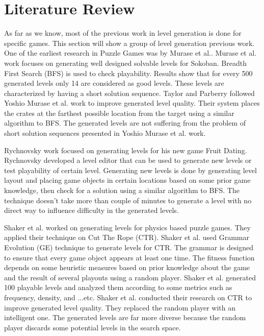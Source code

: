 \documentclass[letterpaper]{article}
\begin{document}
\section{Literature Review}
As far as we know, most of the previous work in level generation is done for specific games. This section will show a group of level generation previous work. One of the earliest research in Puzzle Games was by Murase et al.\cite{sokobanLevelGenerationOld}. Murase et al. work focuses on generating well designed solvable levels for Sokoban\cite{sokoban}. Breadth First Search (BFS) is used to check playability. Results show that for every 500 generated levels only 14 are considered as good levels. These levels are characterized by having a short solution sequence. Taylor and Parberry\cite{sokobanLevelGenerationNew} followed Yoshio Murase et al. work\cite{sokobanLevelGenerationOld} to improve generated level quality. Their system places the crates at the farthest possible location from the target using a similar algorithm to BFS. The generated levels are not suffering from the problem of short solution sequences presented in Yoshio Murase et al. work\cite{sokobanLevelGenerationOld}.\\\par

Rychnovsky work\cite{fruitDatingPCG} focused on generating levels for his new game Fruit Dating\cite{fruitDating}. Rychnovsky developed a level editor that can be used to generate new levels or test playability of certain level. Generating new levels is done by generating level layout and placing game objects in certain locations based on some prior game knowledge, then check for a solution using a similar algorithm to BFS. The technique doesn't take more than couple of minutes to generate a level with no direct way to influence difficulty in the generated levels.\\\par

Shaker et al.\cite{ctrAutomaticGeneration} worked on generating levels for physics based puzzle games. They applied their technique on Cut The Rope (CTR)\cite{cutTheRope}. Shaker et al. used Grammar Evolution (GE) technique to generate levels for CTR. The grammar is designed to ensure that every game object appears at least one time. The fitness function depends on some heuristic measures based on prior knowledge about the game and the result of several playouts using a random player. Shaker et al. generated 100 playable levels and analyzed them according to some metrics such as frequency, density, and ...etc. Shaker et al.\cite{ctrSimulationApproach} conducted their research on CTR to improve generated level quality. They replaced the random player with an intelligent one. The generated levels are far more diverse because the random player discards some potential levels in the search space.\\\par
\end{document}
